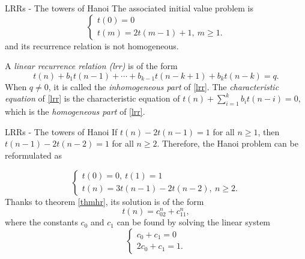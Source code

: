 \documentclass{beamer}
\begin{document}
\begin{frame}{LRRs - The towers of Hanoi}
	The associated initial value problem is
	\begin{displaymath}
		\begin{cases}
			t(0)= 0\\
			t(m)= 2t(m-1) + 1,\ m \geq 1.
		\end{cases}
	\end{displaymath}
	and its recurrence relation is not homogeneous.
	\begin{defn}
		A \emph{linear recurrence relation (lrr)} is of the form
		\begin{equation}\label{lrr}
			t(n) + b_1t(n-1) + \cdots + b_{k-1}t(n-k+1) + b_kt(n-k)= q.
		\end{equation}
		When $q \neq 0$, it is called the \emph{inhomogeneous part} of
		\eqref{lrr}.
		The \emph{characteristic equation} of \eqref{lrr} is the characteristic
		equation of $t(n) + \sum_{i= 1}^k b_it(n-i)= 0$, which is the
		\emph{homogeneous part} of \eqref{lrr}.
	\end{defn}
\end{frame}

%

\begin{frame}{LRRs - The towers of Hanoi}
	If $t(n) - 2t(n-1) = 1$ for all $n \geq 1$, then $t(n-1) - 2t(n-2) = 1$ for
	all $n \geq 2$. Therefore, the Hanoi problem can be reformulated as

	\begin{displaymath}
		\begin{cases}
			t(0)= 0,\ t(1)= 1\\
			t(n)= 3t(n-1) - 2t(n-2),\ n \geq 2.
		\end{cases}
	\end{displaymath}
	Thanks to theorem \ref{thmhr}, its solution is of the form
	\begin{equation*}
		t(n) = c_02^n + c_11^n,
	\end{equation*}
	where the constants $c_0$ and $c_1$ can be found by solving the linear
	system
	\begin{displaymath}
		\begin{cases}
			c_0 + c_1 = 0\\
			2c_0 + c_1 = 1.
		\end{cases}
	\end{displaymath}
\end{frame}

%
\end{document}
